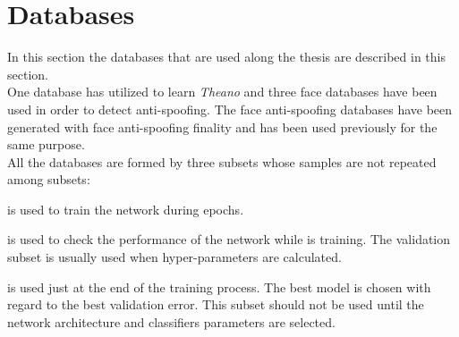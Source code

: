 \section{Databases} \label{sec:methd_databses}
In this section the databases that are used along the thesis are described in this section.\\

One database has utilized to learn \textit{Theano} and three face databases have been used in order to detect anti-spoofing. The face anti-spoofing databases have been generated with face anti-spoofing finality and has been used previously for the same purpose.\\

All the databases are formed by three subsets whose samples are not repeated among subsets:
\begin{description}[itemsep=2pt,topsep=8pt,parsep=0pt,partopsep=20pt]
\item[Training subset:] is used to train the network during epochs.
\item[Validation subset:] is used to check the performance of the network while is training. The validation subset is usually used when hyper-parameters are calculated.
\item[Test subset:] is used just at the end of the training process. The best model is chosen with regard to the best validation error. This subset should not be used until the network architecture and classifiers parameters are selected.
\end{description}

